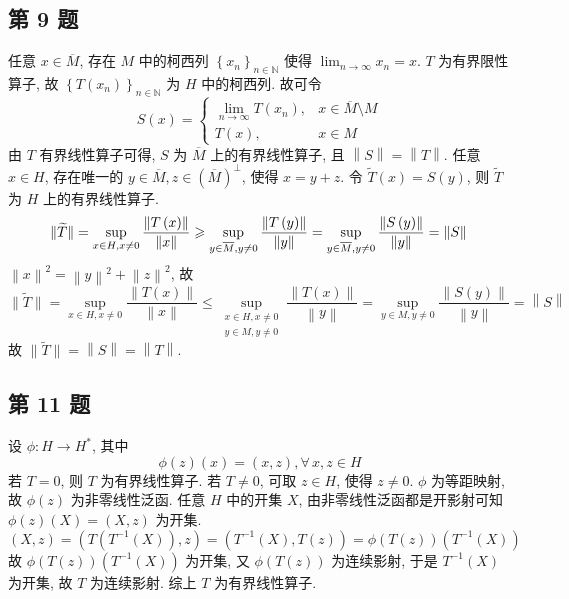 \documentclass[../main.tex]{subfiles}
\begin{document}
\subsection{第 9 题}
任意 $x \in \overline{M}$, 存在 $M$ 中的柯西列 $\left\{ x_n \right\}_{n \in \mathbb{N}}$ 使得 $\displaystyle \lim_{n \to \infty} x_n = x$.
$T$ 为有界限性算子, 故 $\left\{ T \left( x_n \right) \right\}_{n \in \mathbb{N}}$ 为 $H$ 中的柯西列.
故可令
\[
    S \left( x \right) = \begin{cases}
        \displaystyle \lim_{n \to \infty} T \left( x_n \right), & x \in \overline{M} \setminus M \\
        T \left( x \right), & x \in M
    \end{cases}
\]
由 $T$ 有界线性算子可得, $S$ 为 $\overline{M}$ 上的有界线性算子, 且 $\left\| S \right\| = \left\| T \right\|$.
任意 $x \in H$, 存在唯一的 $y \in \overline{M}, z \in \left( \overline{M} \right)^\bot$, 使得 $x = y + z$.
令 $\widetilde{T} \left( x \right) = S \left( y \right)$, 则 $\widetilde{T}$ 为 $H$ 上的有界线性算子.
\[
    \| \widetilde{T} \|
    =
    \sup_{x \in H, x \neq 0} \frac{\left\| T \left( x \right) \right\|}{\left\| x \right\|}
    \geqslant
    \sup_{y \in \overline{M}, y \neq 0} \frac{\left\| T \left( y \right) \right\|}{\left\| y \right\|}
    =
    \sup_{y \in \overline{M}, y \neq 0} \frac{\left\| S \left( y \right) \right\|}{\left\| y \right\|}
    =
    \left\| S \right\| \\
\]
$\left\| x \right\|^2 = \left\| y \right\|^2 + \left\| z \right\|^2$, 故
\[
    \| \widetilde{T} \|
    =
    \sup_{x \in H, x \neq 0} \frac{\left\| T \left( x \right) \right\|}{\left\| x \right\|}
    \leqslant
    \sup_{\substack{x \in H, x \neq 0 \\ y \in M, y \neq 0}} \frac{\left\| T \left( x \right) \right\|}{\left\| y \right\|}
    =
    \sup_{y \in M, y \neq 0} \frac{\left\| S \left( y \right) \right\|}{\left\| y \right\|}
    =
    \left\| S \right\|
\]
故 $\| \widetilde{T} \| = \left\| S \right\| = \left\| T \right\|$.

\subsection{第 11 题}
设 $\phi : H \to H^*$, 其中
\[
    \phi \left( z \right) \left( x \right) = \left( x, z \right)
    , \forall \, x, z \in H
\]
若 $T = 0$, 则 $T$ 为有界线性算子.
若 $T \neq 0$, 可取 $z \in H$, 使得 $z \neq 0$.
$\phi$ 为等距映射, 故 $\phi \left( z \right)$ 为非零线性泛函.
任意 $H$ 中的开集 $X$,
由非零线性泛函都是开影射可知 $\phi \left( z \right) \left( X \right) = \left( X, z \right)$ 为开集.
\[
    \left( X, z \right)
    = \left( T \left( T^{-1} \left( X \right) \right), z \right)    = \left( T^{-1} \left( X \right), T \left( z \right) \right)
    = \phi \left( T \left( z \right) \right) \left( T^{-1} \left( X \right) \right)
\]
故 $\phi \left( T \left( z \right) \right) \left( T^{-1} \left( X \right) \right)$ 为开集,
又 $\phi \left( T \left( z \right) \right)$ 为连续影射, 于是 $T^{-1} \left( X \right)$ 为开集, 故 $T$ 为连续影射.
综上 $T$ 为有界线性算子.
\end{document}
